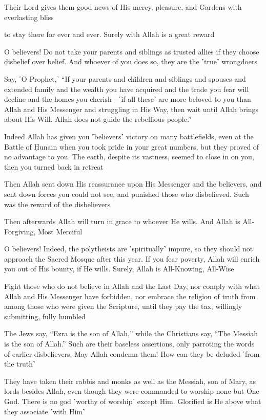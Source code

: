 Their Lord gives them good news of His mercy, pleasure, and Gardens with everlasting bliss

to stay there for ever and ever. Surely with Allah is a great reward

O believers! Do not take your parents and siblings as trusted allies if they choose disbelief over belief. And whoever of you does so, they are the ˹true˺ wrongdoers

Say, ˹O Prophet,˺ “If your parents and children and siblings and spouses and extended family and the wealth you have acquired and the trade you fear will decline and the homes you cherish—˹if all these˺ are more beloved to you than Allah and His Messenger and struggling in His Way, then wait until Allah brings about His Will. Allah does not guide the rebellious people.”

Indeed Allah has given you ˹believers˺ victory on many battlefields, even at the Battle of Ḥunain when you took pride in your great numbers, but they proved of no advantage to you. The earth, despite its vastness, seemed to close in on you, then you turned back in retreat

Then Allah sent down His reassurance upon His Messenger and the believers, and sent down forces you could not see, and punished those who disbelieved. Such was the reward of the disbelievers

Then afterwards Allah will turn in grace to whoever He wills. And Allah is All-Forgiving, Most Merciful

O believers! Indeed, the polytheists are ˹spiritually˺ impure, so they should not approach the Sacred Mosque after this year. If you fear poverty, Allah will enrich you out of His bounty, if He wills. Surely, Allah is All-Knowing, All-Wise

Fight those who do not believe in Allah and the Last Day, nor comply with what Allah and His Messenger have forbidden, nor embrace the religion of truth from among those who were given the Scripture, until they pay the tax, willingly submitting, fully humbled

The Jews say, “Ezra is the son of Allah,” while the Christians say, “The Messiah is the son of Allah.” Such are their baseless assertions, only parroting the words of earlier disbelievers. May Allah condemn them! How can they be deluded ˹from the truth˺

They have taken their rabbis and monks as well as the Messiah, son of Mary, as lords besides Allah, even though they were commanded to worship none but One God. There is no god ˹worthy of worship˺ except Him. Glorified is He above what they associate ˹with Him˺

